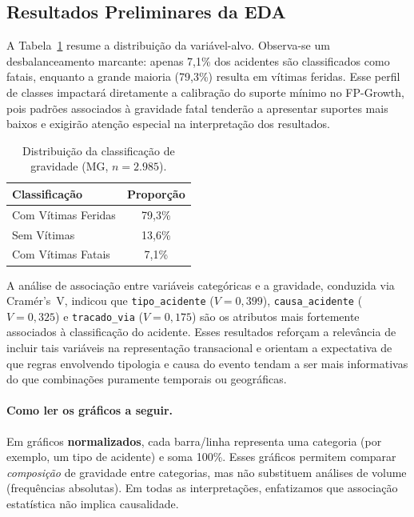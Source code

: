 \documentclass[12pt]{article}
\begin{document}
\subsection{Resultados Preliminares da EDA}

A Tabela~\ref{tab:gravidade} resume a distribuição da variável-alvo. Observa-se um desbalanceamento marcante: apenas 7,1\% dos acidentes são classificados como fatais, enquanto a grande maioria (79,3\%) resulta em vítimas feridas. Esse perfil de classes impactará diretamente a calibração do suporte mínimo no FP-Growth, pois padrões associados à gravidade fatal tenderão a apresentar suportes mais baixos e exigirão atenção especial na interpretação dos resultados.

\begin{table}[H]
    \centering
    \caption{Distribuição da classificação de gravidade (MG, $n = 2.985$).}
    \label{tab:gravidade}
    \begin{tabular}{lc}
        \toprule
        \textbf{Classificação} & \textbf{Proporção} \\
        \midrule
        Com Vítimas Feridas & 79,3\% \\
        Sem Vítimas & 13,6\% \\
        Com Vítimas Fatais & 7,1\% \\
        \bottomrule
    \end{tabular}
\end{table}

A análise de associação entre variáveis categóricas e a gravidade, conduzida via Cramér's~V, indicou que \texttt{tipo\_acidente} ($V = 0{,}399$), \texttt{causa\_acidente} ($V = 0{,}325$) e \texttt{tracado\_via} ($V = 0{,}175$) são os atributos mais fortemente associados à classificação do acidente. Esses resultados reforçam a relevância de incluir tais variáveis na representação transacional e orientam a expectativa de que regras envolvendo tipologia e causa do evento tendam a ser mais informativas do que combinações puramente temporais ou geográficas.

\paragraph{Como ler os gráficos a seguir.}
Em gráficos \textbf{normalizados}, cada barra/linha representa uma categoria (por exemplo, um tipo de acidente) e soma 100\%. Esses gráficos permitem comparar \textit{composição} de gravidade entre categorias, mas não substituem análises de volume (frequências absolutas). Em todas as interpretações, enfatizamos que associação estatística não implica causalidade.
\end{document}
